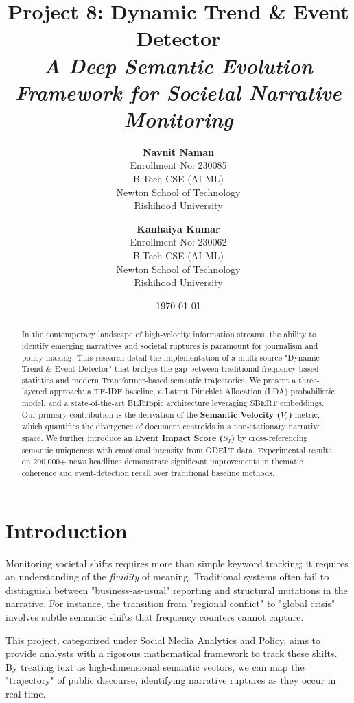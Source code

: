 \documentclass[12pt,a4paper]{article}
\title{
    \textbf{Project 8: Dynamic Trend \& Event Detector} \\
    \large \textit{A Deep Semantic Evolution Framework for Societal Narrative Monitoring}
}
\author{
    \textbf{Navnit Naman} \\
    \small Enrollment No: 230085 \\
    \small B.Tech CSE (AI-ML) \\
    \small Newton School of Technology \\
    \small Rishihood University
    \and
    \textbf{Kanhaiya Kumar} \\
    \small Enrollment No: 230062 \\
    \small B.Tech CSE (AI-ML) \\
    \small Newton School of Technology \\
    \small Rishihood University
}
\date{\today}
\begin{document}
\maketitle

\begin{abstract}
In the contemporary landscape of high-velocity information streams, the ability to identify emerging narratives and societal ruptures is paramount for journalism and policy-making. This research detail the implementation of a multi-source "Dynamic Trend \& Event Detector" that bridges the gap between traditional frequency-based statistics and modern Transformer-based semantic trajectories. We present a three-layered approach: a TF-IDF baseline, a Latent Dirichlet Allocation (LDA) probabilistic model, and a state-of-the-art BERTopic architecture leveraging SBERT embeddings. Our primary contribution is the derivation of the \textbf{Semantic Velocity ($V_s$)} metric, which quantifies the divergence of document centroids in a non-stationary narrative space. We further introduce an \textbf{Event Impact Score ($S_I$)} by cross-referencing semantic uniqueness with emotional intensity from GDELT data. Experimental results on 200,000+ news headlines demonstrate significant improvements in thematic coherence and event-detection recall over traditional baseline methods.
\end{abstract}

\tableofcontents
\vspace{1em} %

\section{Introduction}
Monitoring societal shifts requires more than simple keyword tracking; it requires an understanding of the \textit{fluidity} of meaning. Traditional systems often fail to distinguish between "business-as-usual" reporting and structural mutations in the narrative. For instance, the transition from "regional conflict" to "global crisis" involves subtle semantic shifts that frequency counters cannot capture.

This project, categorized under Social Media Analytics and Policy, aims to provide analysts with a rigorous mathematical framework to track these shifts. By treating text as high-dimensional semantic vectors, we can map the "trajectory" of public discourse, identifying narrative ruptures as they occur in real-time.
\end{document}
